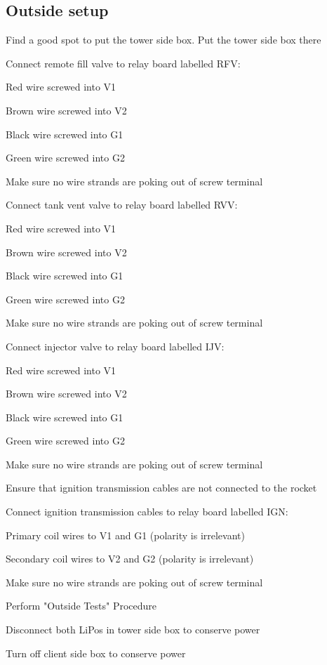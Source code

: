 \subsection{Outside setup}
\begin{checklist}
    \item Find a good spot to put the tower side box. Put the tower side box there
    \item Connect remote fill valve to relay board labelled RFV:
    \begin{checklist}
        \item Red wire screwed into V1
        \item Brown wire screwed into V2
        \item Black wire screwed into G1
        \item Green wire screwed into G2
        \item Make sure no wire strands are poking out of screw terminal
    \end{checklist}
    \item Connect tank vent valve to relay board labelled RVV:
    \begin{checklist}
        \item Red wire screwed into V1
        \item Brown wire screwed into V2
        \item Black wire screwed into G1
        \item Green wire screwed into G2
        \item Make sure no wire strands are poking out of screw terminal
    \end{checklist}
    \item Connect injector valve to relay board labelled IJV:
    \begin{checklist}
        \item Red wire screwed into V1
        \item Brown wire screwed into V2
        \item Black wire screwed into G1
        \item Green wire screwed into G2
        \item Make sure no wire strands are poking out of screw terminal
    \end{checklist}
    \item Ensure that ignition transmission cables are not connected to the rocket
    \item Connect ignition transmission cables to relay board labelled IGN:
    \begin{checklist}
        \item Primary coil wires to V1 and G1 (polarity is irrelevant)
        \item Secondary coil wires to V2 and G2 (polarity is irrelevant)
        \item Make sure no wire strands are poking out of screw terminal
    \end{checklist}
    \item Perform "Outside Tests" Procedure
    \item Disconnect both LiPos in tower side box to conserve power
    \item Turn off client side box to conserve power
\end{checklist}
